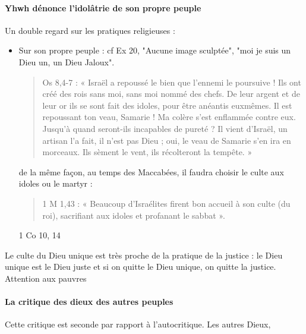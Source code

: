 \paragraph{Yhwh dénonce l’idolâtrie de son propre peuple} Un double regard sur les pratiques religieuses : 
\begin{itemize}
    \item Sur son propre peuple : cf Ex 20, "Aucune image sculptée", "moi je suis un Dieu un, un Dieu Jaloux".
    \begin{quote}
        Os 8,4-7 : « Israël a repoussé le bien que l’ennemi le poursuive ! Ils ont créé des rois sans moi, sans
moi nommé des chefs. De leur argent et de leur or ils se sont fait des idoles, pour être anéantis euxmêmes. Il est repoussant ton veau, Samarie ! Ma colère s’est enflammée contre eux. Jusqu’à quand
seront-ils incapables de pureté ? Il vient d’Israël, un artisan l’a fait, il n’est pas Dieu ; oui, le veau de
Samarie s’en ira en morceaux. Ils sèment le vent, ils récolteront la tempête. »
    \end{quote}
    de la même façon, au temps des Maccabées, il faudra choisir le culte aux idoles ou le martyr : 
    \begin{quote}
        1 M 1,43 : « Beaucoup d’Israélites firent bon accueil à son culte (du roi), sacrifiant aux idoles et
profanant le sabbat ».
    \end{quote}
    1 Co 10, 14
    
    
\end{itemize}



Le culte du Dieu unique est très proche de la pratique de la justice : le Dieu unique est le Dieu juste et si on quitte le Dieu unique, on quitte la justice. Attention aux pauvres


\paragraph{La critique des dieux des autres peuples} Cette critique est seconde par rapport à l'autocritique. Les autres Dieux, 

